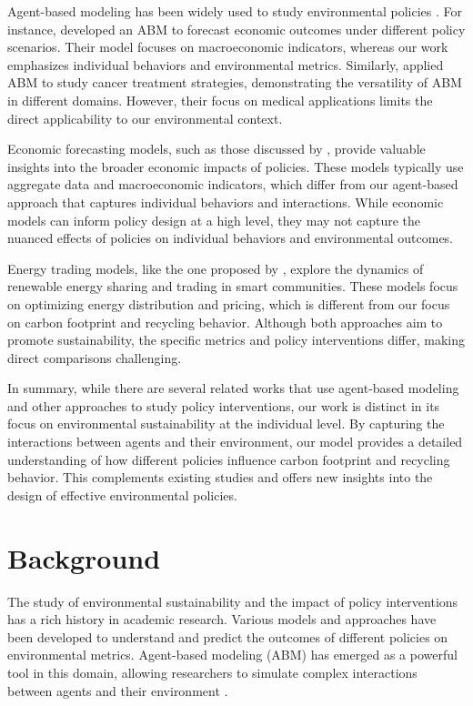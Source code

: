 \documentclass{article} %
\begin{document}
Agent-based modeling has been widely used to study environmental policies \citep{ma2023community}. For instance, \citet{poledna2023economic} developed an ABM to forecast economic outcomes under different policy scenarios. Their model focuses on macroeconomic indicators, whereas our work emphasizes individual behaviors and environmental metrics. Similarly, \citet{west2023agent} applied ABM to study cancer treatment strategies, demonstrating the versatility of ABM in different domains. However, their focus on medical applications limits the direct applicability to our environmental context.

Economic forecasting models, such as those discussed by \citet{poledna2023economic}, provide valuable insights into the broader economic impacts of policies. These models typically use aggregate data and macroeconomic indicators, which differ from our agent-based approach that captures individual behaviors and interactions. While economic models can inform policy design at a high level, they may not capture the nuanced effects of policies on individual behaviors and environmental outcomes.

Energy trading models, like the one proposed by \citet{zhou2023peer}, explore the dynamics of renewable energy sharing and trading in smart communities. These models focus on optimizing energy distribution and pricing, which is different from our focus on carbon footprint and recycling behavior. Although both approaches aim to promote sustainability, the specific metrics and policy interventions differ, making direct comparisons challenging.

In summary, while there are several related works that use agent-based modeling and other approaches to study policy interventions, our work is distinct in its focus on environmental sustainability at the individual level. By capturing the interactions between agents and their environment, our model provides a detailed understanding of how different policies influence carbon footprint and recycling behavior. This complements existing studies and offers new insights into the design of effective environmental policies.

\section{Background}
\label{sec:background}

The study of environmental sustainability and the impact of policy interventions has a rich history in academic research. Various models and approaches have been developed to understand and predict the outcomes of different policies on environmental metrics. Agent-based modeling (ABM) has emerged as a powerful tool in this domain, allowing researchers to simulate complex interactions between agents and their environment \citep{poledna2023economic, west2023agent}.
\end{document}
